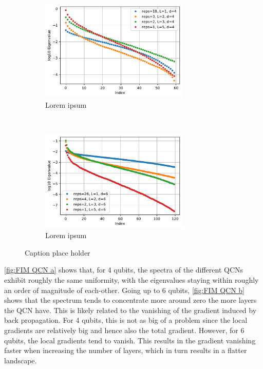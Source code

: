 \begin{figure}[H]
    \centering
    \begin{subfigure}[t]{0.5\textwidth}
        \centering
        \includegraphics[height=1.9in]{latex/figures/FIM_qubits_4_comparison.pdf}
        \caption{Lorem ipsum}
        \label{fig:FIM QCN a}
    \end{subfigure}%
    ~ 
    \begin{subfigure}[t]{0.5\textwidth}
        \centering
        \includegraphics[height=1.9in]{latex/figures/FIM_qubits_6_comparison.pdf}
        \caption{Lorem ipsum}
        \label{fig:FIM QCN b}
    \end{subfigure}
    \caption{Caption place holder}
    \label{fig:FIM QCN}
\end{figure}

\autoref{fig:FIM QCN a} shows that, for 4 qubits, the spectra of the different QCNs exhibit roughly the same uniformity, with the eigenvalues staying within roughly an order of magnitude of each-other. Going up to 6 qubits, \autoref{fig:FIM QCN b} shows that the spectrum tends to concentrate more around zero the more layers the QCN have. This is likely related to the vanishing of the gradient induced by back propagation. For 4 qubits, this is not as big of a problem since the local gradients are relatively big and hence also the total gradient. However, for 6 qubits, the local gradients tend to vanish. This results in the gradient vanishing faster when increasing the number of layers, which in turn results in a flatter landscape. 


